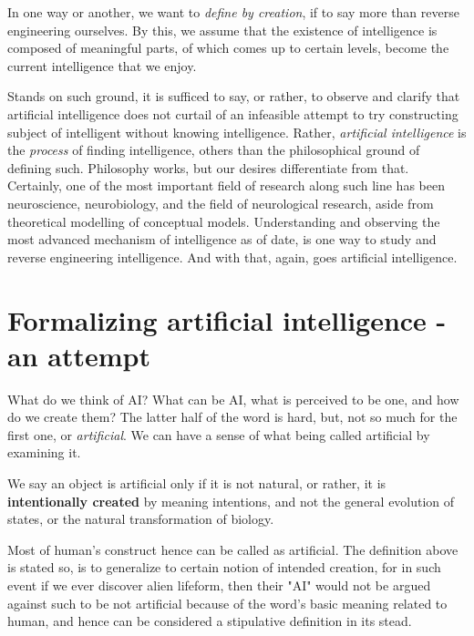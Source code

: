 In one way or another, we want to \textit{define by creation}, if to say more than reverse engineering ourselves. By this, we assume that the existence of intelligence is composed of meaningful parts, of which comes up to certain levels, become the current intelligence that we enjoy. 

Stands on such ground, it is sufficed to say, or rather, to observe and clarify that artificial intelligence does not curtail of an infeasible attempt to try constructing subject of intelligent without knowing intelligence. Rather, \textit{artificial intelligence} is the \textit{process} of finding intelligence, others than the philosophical ground of defining such. Philosophy works, but our desires differentiate from that. Certainly, one of the most important field of research along such line has been neuroscience, neurobiology, and the field of neurological research, aside from theoretical modelling of conceptual models. Understanding and observing the most advanced mechanism of intelligence as of date, is one way to study and reverse engineering intelligence. And with that, again, goes artificial intelligence. 

\section{Formalizing artificial intelligence - an attempt}

What do we think of AI? What can be AI, what is perceived to be one, and how do we create them? The latter half of the word is hard, but, not so much for the first one, or \textit{artificial}. We can have a sense of what being called artificial by examining it. 

\begin{definition}[Artificial]
    We say an object is artificial only if it is not natural, or rather, it is \textbf{intentionally created} by meaning intentions, and not the general evolution of states, or the natural transformation of biology. 
\end{definition}

Most of human's construct hence can be called as artificial. The definition above is stated so, is to generalize to certain notion of intended creation, for in such event if we ever discover alien lifeform, then their "AI" would not be argued against such to be not artificial because of the word's basic meaning related to human, and hence can be considered a stipulative definition in its stead. 

